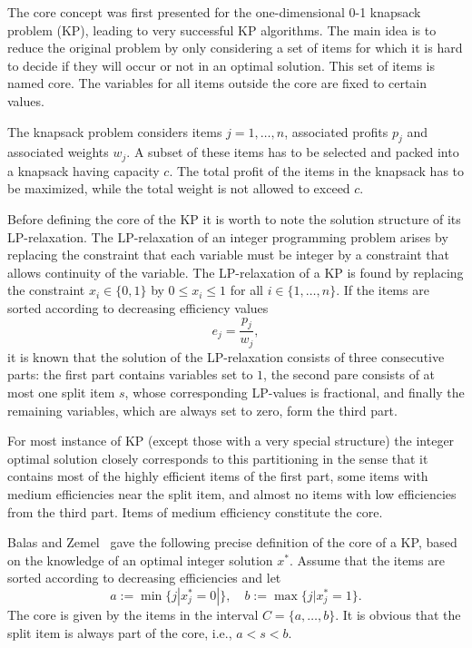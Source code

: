The core concept was first presented for the one-dimensional 0-1 knapsack problem (KP),
leading to very successful KP algorithms.
The main idea is to reduce the original problem by only considering a set of
items for which it is hard to decide if they will occur or not in an optimal solution.
This set of items is named core.
The variables for all items outside the core are fixed to certain values.

The knapsack problem considers items $j = 1, \ldots, n$, associated profits $p_j$ and
associated weights $w_j$.
A subset of these items has to be selected and packed into a knapsack having capacity $c$.
The total profit of the items in the knapsack has to be maximized, while the
total weight is not allowed to exceed $c$.

Before defining the core of the KP it is worth to note the solution structure
of its LP-relaxation.
The LP-relaxation of an integer programming problem arises by replacing the
constraint that each variable must be integer by a constraint that allows
continuity of the variable.
The LP-relaxation of a KP is found by replacing the constraint $x_i \in \{0,1\}$
by $0 \leqslant x_i \leqslant 1$ for all $i \in \{1, \ldots, n\}$.
If the items are sorted according to decreasing efficiency values
\begin{equation}
  e_j = \frac{p_j}{w_j},
\end{equation}
it is known that the solution of the LP-relaxation consists of
three consecutive parts: the first part contains variables set to $1$, the second
pare consists of at most one split item $s$, whose corresponding LP-values is
fractional, and finally the remaining variables, which are always set to zero,
form the third part.

For most instance of KP (except those with a very special structure) the integer
optimal solution closely corresponds to this partitioning in the sense that it
contains most of the highly efficient items of the first part, some items with
medium efficiencies near the split item, and almost no items with low efficiencies
from the third part.
Items of medium efficiency constitute the core.

Balas and Zemel~\cite{balas1980algorithm} gave the following precise definition
of the core of a KP, based on the knowledge of an optimal integer solution $x^*$.
Assume that the items are sorted according to decreasing efficiencies and let
\begin{equation}
  a := \min\{ j | x_j^* = 0 |\}, \quad b := \max\{ j | x_j^* = 1 \}.
\end{equation}
The core is given by the items in the interval $C = \{a, \ldots, b\}$.
It is obvious that the split item is always part of the core, i.e., $a < s < b$.

